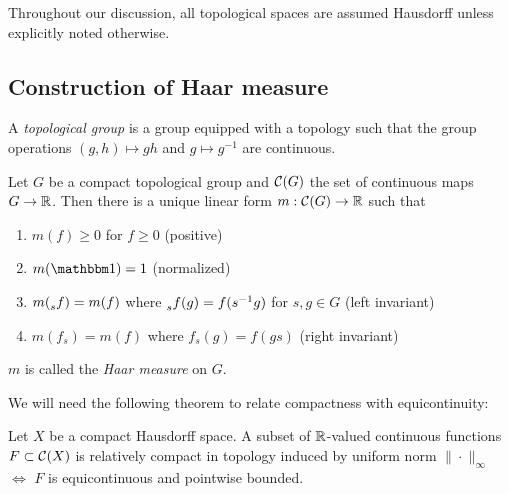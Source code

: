 
Throughout our discussion, all topological spaces are assumed Hausdorff
unless explicitly noted otherwise.

\subsection{Construction of Haar measure}

\begin{definition}
  A \emph{topological group} is a group equipped with a topology
  such that the group operations $(g, h) \mapsto gh$ and $g \mapsto g^{-1}$
  are continuous.
\end{definition}

\begin{theorem}
  \label{thm:haar-measure}
  Let $G$ be a compact topological group and $\mathcal{C}(G)$ the set of continuous
  maps $G \to \mathbb{R}$.
  Then there is a unique linear form $m : \mathcal{C}(G) \to \mathbb{R}$ such that
  \begin{enumerate}
    \item $m(f) \geq 0$ for $f \geq 0$ (positive)
    \item $m(\ind) = 1$ (normalized)
    \item $m(\prescript{}{s}{f}) = m(f)$ where
      $\prescript{}{s}{f}(g) = f(s^{-1} g)$
      for $s,g \in G$ (left invariant)
    \item $m(f_s) = m(f)$ where $f_s(g) = f(gs)$ (right invariant)
  \end{enumerate}
  $m$ is called the \emph{Haar measure} on $G$.
\end{theorem}

We will need the following theorem to relate compactness
with equicontinuity:
\begin{theorem}
  \label{thm:arzela-ascoli}
  Let $X$ be a compact Hausdorff space.
  A subset of $\mathbb{R}$-valued continuous functions $F \subset \mathcal{C}(X)$
  is relatively compact in topology
  induced by uniform norm $\|\cdot\|_\infty$
  $\iff$ $F$ is equicontinuous and pointwise bounded.
\end{theorem}

